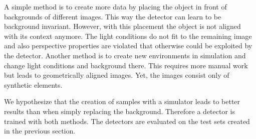 A simple method is to create more data by placing the object in front of backgrounds of different images. This way the detector can learn to be background invariant. However, with this placement the object is not aligned with its context anymore. The light conditions do not fit to the remaining image and also perspective properties are violated that otherwise could be exploited by the detector. Another method is to create new environments in simulation and change light conditions and background there. This requires more manual work but leads to geometrically aligned images. Yet, the images consist only of synthetic elements.

We hypothesize that the creation of samples with a simulator leads to better results than when simply replacing the background. Therefore a detector is trained with both methods. The detectors are evaluated on the test sets created in the previous section.

